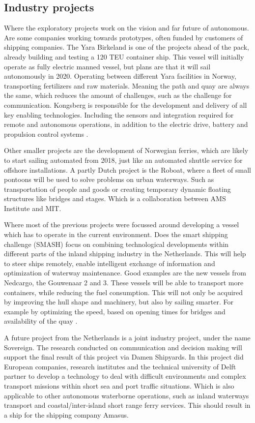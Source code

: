 \subsection{Industry projects}
Where the exploratory projects work on the vision and far future of autonomous. Are some companies working towards prototypes, often funded by customers of shipping companies.
The Yara Birkeland is one of the projects ahead of the pack, already building and testing a 120 \ac{TEU} container ship. This vessel will initially operate as fully electric manned vessel, but plans are that it will sail autonomously in 2020. Operating between different Yara facilities in Norway, transporting fertilizers and raw materials. Meaning the path and quay are always the same, which reduces the amount of challenges, such as the challenge for communication.
Kongsberg is responsible for the development and delivery of all key enabling technologies. Including the sensors and integration required for remote and autonomous operations, in addition to the electric drive, battery and propulsion control systems \cite{Sames2017}.

Other smaller projects are the development of Norwegian ferries, which are likely to start sailing automated from 2018, just like an automated shuttle service for offshore installations. A partly Dutch project is the Roboat, where a fleet of small pontoons will be used to solve problems on urban waterways. Such as transportation of people and goods or creating temporary dynamic floating structures like bridges and stages. Which is a collaboration between AMS Institute and MIT.

Where most of the previous projects were focussed around developing a vessel which has to operate in the current environment. Does the smart shipping challenge (SMASH) focus on combining technological developments within different parts of the inland shipping industry in the Netherlands. This will help to steer ships remotely, enable intelligent exchange of information and optimization of waterway maintenance.
Good examples are the new vessels from Nedcargo, the Gouwenaar 2 and 3. These vessels will be able to transport more containers, while reducing the fuel consumption. This will not only be acquired by improving the hull shape and machinery, but also by sailing smarter. For example by optimizing the speed, based on opening times for bridges and availability of the quay \cite{SMASH2017}. 

A future project from the Netherlands is a joint industry project, under the name Sovereign. The research conducted on communication and decision making will support the final result of this project via Damen Shipyards. In this project did European companies, research institutes and the technical university of Delft partner to develop a technology to deal with difficult environments and complex transport missions within short sea and port traffic situations. Which is also applicable to other autonomous waterborne operations, such as inland waterways transport and coastal/inter-island short range ferry services. This should result in a ship for the shipping company Amasus.

